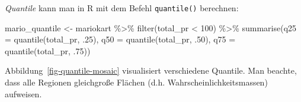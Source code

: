 \documentclass[
  letterpaper,
]{scrbook}
\newenvironment{Shaded}{\begin{snugshade}}{\end{snugshade}}
\newcommand{\AttributeTok}[1]{\textcolor[rgb]{0.40,0.45,0.13}{#1}}
\newcommand{\DecValTok}[1]{\textcolor[rgb]{0.68,0.00,0.00}{#1}}
\newcommand{\FunctionTok}[1]{\textcolor[rgb]{0.28,0.35,0.67}{#1}}
\newcommand{\NormalTok}[1]{\textcolor[rgb]{0.00,0.23,0.31}{#1}}
\newcommand{\OtherTok}[1]{\textcolor[rgb]{0.00,0.23,0.31}{#1}}
\newcommand{\SpecialCharTok}[1]{\textcolor[rgb]{0.37,0.37,0.37}{#1}}
\theoremstyle{definition}
\theoremstyle{definition}
\theoremstyle{definition}
\theoremstyle{remark}
\begin{document}
\emph{Quantile} kann man in R mit dem Befehl \texttt{quantile()}
berechnen:

\begin{Shaded}
\begin{Highlighting}[]
\NormalTok{mario\_quantile }\OtherTok{\textless{}{-}} 
\NormalTok{mariokart }\SpecialCharTok{\%\textgreater{}\%} 
  \FunctionTok{filter}\NormalTok{(total\_pr }\SpecialCharTok{\textless{}} \DecValTok{100}\NormalTok{) }\SpecialCharTok{\%\textgreater{}\%} 
  \FunctionTok{summarise}\NormalTok{(}\AttributeTok{q25 =} \FunctionTok{quantile}\NormalTok{(total\_pr, .}\DecValTok{25}\NormalTok{),}
            \AttributeTok{q50 =} \FunctionTok{quantile}\NormalTok{(total\_pr, .}\DecValTok{50}\NormalTok{),}
            \AttributeTok{q75 =} \FunctionTok{quantile}\NormalTok{(total\_pr, .}\DecValTok{75}\NormalTok{))}
\end{Highlighting}
\end{Shaded}

Abbildung~\ref{fig-quantile-mosaic} visualisiert verschiedene Quantile.
Man beachte, dass alle Regionen gleichgroße Flächen (d.h.
Wahrscheinlichkeitsmassen) aufweisen.
\end{document}
